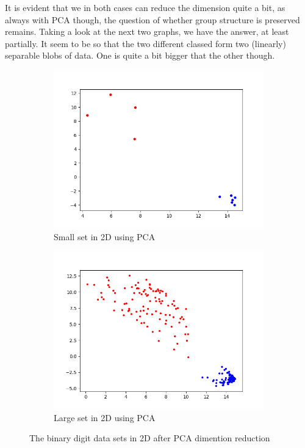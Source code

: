 \documentclass[12pt, a4paper]{article}
\begin{document}
It is evident that we in both cases can reduce the dimension quite a bit, as always with PCA though, the question of whether group structure is preserved remains. Taking a look at the next two graphs, we have the answer, at least partially. It seem to be so that the two different classed form two (linearly) separable blobs of data. One is quite a bit bigger that the other though.

\begin{figure}[H]
    \centering
    \begin{subfigure}{0.45\textwidth}
        \includegraphics[width=\textwidth]{recursos/3/pca_smaller}
        \caption{ Small set in 2D using PCA }
    \end{subfigure}
    \begin{subfigure}{0.45\textwidth}
        \includegraphics[width=\textwidth]{recursos/3/pca_larger}
        \caption{ Large set in 2D using PCA }
    \end{subfigure}
     \caption{The binary digit data sets in 2D after PCA dimention reduction}
\end{figure}
\end{document}
